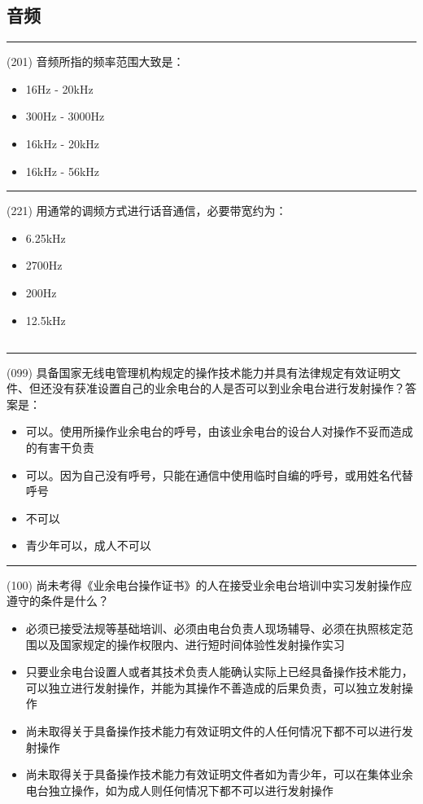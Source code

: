 \documentclass[twocolumn,hyperref,UTF8]{ctexart}  %
\begin{document}
\clearpage
\subsection{音频}


\noindent\rule{0.5\textwidth}{1pt}
\heiti (201) 音频所指的频率范围大致是： \songti {\color{gray} [LK0495] }
\begin{itemize}
	\item  16Hz - 20kHz
	\item  300Hz - 3000Hz
	\item  16kHz - 20kHz
	\item  16kHz - 56kHz
\end{itemize}


\noindent\rule{0.5\textwidth}{1pt}
\heiti (221) 用通常的调频方式进行话音通信，必要带宽约为： \songti {\color{gray} [LK0123] }
\begin{itemize}
	\item  6.25kHz
	\item  2700Hz
	\item  200Hz
	\item  12.5kHz
\end{itemize}




\clearpage
\subsection{}


\noindent\rule{0.5\textwidth}{1pt}
\heiti (099) 具备国家无线电管理机构规定的操作技术能力并具有法律规定有效证明文件、但还没有获准设置自己的业余电台的人是否可以到业余电台进行发射操作？答案是： \songti {\color{gray} [LK0063] }
\begin{itemize}
	\item  可以。使用所操作业余电台的呼号，由该业余电台的设台人对操作不妥而造成的有害干负责
	\item  可以。因为自己没有呼号，只能在通信中使用临时自编的呼号，或用姓名代替呼号
	\item  不可以
	\item  青少年可以，成人不可以
\end{itemize}


\noindent\rule{0.5\textwidth}{1pt}
\heiti (100) 尚未考得《业余电台操作证书》的人在接受业余电台培训中实习发射操作应遵守的条件是什么？ \songti {\color{gray} [LK0064] }
\begin{itemize}
	\item  必须已接受法规等基础培训、必须由电台负责人现场辅导、必须在执照核定范围以及国家规定的操作权限内、进行短时间体验性发射操作实习
	\item  只要业余电台设置人或者其技术负责人能确认实际上已经具备操作技术能力，可以独立进行发射操作，并能为其操作不善造成的后果负责，可以独立发射操作
	\item  尚未取得关于具备操作技术能力有效证明文件的人任何情况下都不可以进行发射操作
	\item  尚未取得关于具备操作技术能力有效证明文件者如为青少年，可以在集体业余电台独立操作，如为成人则任何情况下都不可以进行发射操作
\end{itemize}
\end{document}
